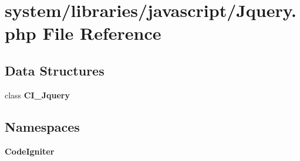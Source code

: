 \section{system/libraries/javascript/\-Jquery.php File Reference}
\label{_jquery_8php}
\subsection*{Data Structures}
\begin{DoxyCompactItemize}
\item 
class {\bf C\-I\-\_\-\-Jquery}
\end{DoxyCompactItemize}
\subsection*{Namespaces}
\begin{DoxyCompactItemize}
\item 
{\bf Code\-Igniter}
\end{DoxyCompactItemize}
